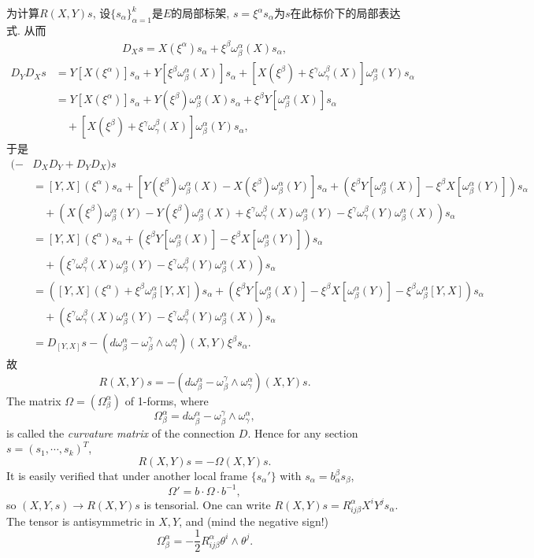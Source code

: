 为计算$R(X,Y)s$, 设$\{s_\alpha\}_{\alpha=1}^k$是$E$的局部标架, $s=\xi^\alpha s_\alpha$为$s$在此标价下的局部表达式. 从而
$$
\begin{aligned}
D_Xs=X(\xi^\alpha)s_\alpha+\xi^\beta\omega_\beta^\alpha(X) s_\alpha,
\end{aligned}
$$
$$
\begin{aligned}
D_YD_Xs&=Y[X(\xi^\alpha)]s_\alpha+Y[\xi^\beta\omega_\beta^\alpha(X)] s_\alpha
+[X(\xi^\beta)+\xi^\gamma\omega_\gamma^\beta(X)]\omega_\beta^\alpha(Y) s_\alpha \\
&=Y[X(\xi^\alpha)]s_\alpha+Y(\xi^\beta)\omega_\beta^\alpha(X)s_\alpha+\xi^\beta Y[\omega_\beta^\alpha(X)]s_\alpha\\
&\quad+[X(\xi^\beta)+\xi^\gamma\omega_\gamma^\beta(X)]\omega_\beta^\alpha(Y) s_\alpha ,
\end{aligned}
$$
于是
$$
\begin{aligned}
(-&D_XD_Y+D_YD_X)s\\
&=[Y,X](\xi^\alpha)s_\alpha
+[Y(\xi^\beta)\omega_\beta^\alpha(X)-X(\xi^\beta)\omega_\beta^\alpha(Y)]s_\alpha+\left(\xi^\beta Y[\omega_\beta^\alpha(X)]-\xi^\beta X[\omega_\beta^\alpha(Y)]\right)s_\alpha\\
&\quad+\left(X(\xi^\beta)\omega_\beta^\alpha(Y)-Y(\xi^\beta)\omega_\beta^\alpha(X)+\xi^\gamma\omega_\gamma^\beta(X)\omega_\beta^\alpha(Y)-\xi^\gamma\omega_\gamma^\beta(Y)\omega_\beta^\alpha(X) \right)s_\alpha\\
&=[Y,X](\xi^\alpha)s_\alpha+\left(\xi^\beta Y[\omega_\beta^\alpha(X)]-\xi^\beta X[\omega_\beta^\alpha(Y)]\right)s_\alpha\\
&\quad+\left(\xi^\gamma\omega_\gamma^\beta(X)\omega_\beta^\alpha(Y)-\xi^\gamma\omega_\gamma^\beta(Y)\omega_\beta^\alpha(X) \right)s_\alpha\\
&=\left([Y,X](\xi^\alpha)+\xi^\beta\omega_\beta^\alpha[Y,X]\right)s_\alpha
+\left(\xi^\beta Y[\omega_\beta^\alpha(X)]-\xi^\beta X[\omega_\beta^\alpha(Y)]-\xi^\beta\omega_\beta^\alpha[Y,X]\right)s_\alpha\\
&\quad+\left(\xi^\gamma\omega_\gamma^\beta(X)\omega_\beta^\alpha(Y)-\xi^\gamma\omega_\gamma^\beta(Y)\omega_\beta^\alpha(X) \right)s_\alpha\\
&=D_{[Y,X]}s-(d\omega_\beta^\alpha-\omega_\beta^\gamma\wedge\omega_\gamma^\alpha)(X,Y)\xi^\beta s_\alpha.
\end{aligned}
$$
故
$$
R(X,Y)s=-(d\omega_\beta^\alpha-\omega_\beta^\gamma\wedge\omega_\gamma^\alpha)(X,Y)s.
$$
The matrix $\Omega=(\Omega_\beta^\alpha)$ of 1-forms, where
$$\Omega_\beta^\alpha=d\omega_\beta^\alpha-\omega_\beta^\gamma\wedge\omega_\gamma^\alpha,$$
is called the \emph{curvature matrix} of the connection $D$. Hence for any section $s=(s_1,\cdots ,s_k)^T$,
$$R(X,Y)s=-\Omega(X,Y)s.$$
It is easily verified that under another local frame $\{s_\alpha'\}$ with $s_\alpha=b_\alpha^\beta s_\beta$,
$$\Omega'=b\cdot\Omega \cdot b^{-1},$$
so $(X,Y,s)\to R(X,Y)s$ is tensorial. One can write $R(X,Y)s=R^\alpha_{ij\beta}X^iY^js_\alpha$. The tensor is antisymmetric in $X,Y$, and (mind the negative sign!)
$$\Omega_\beta^\alpha=-\frac{1}{2}R^\alpha_{ij\beta}\theta^i\wedge\theta^j.$$

